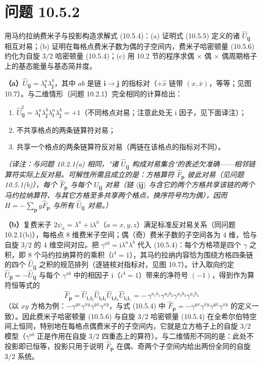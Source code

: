 \section*{问题 10.5.2}
\begin{problem}
用马约拉纳费米子与投影构造求解式 (10.5.4)：(a) 证明式 (10.5.5) 定义的诸 $\hat U_{\pmb{i}\pmb j}$ 相互对易；(b) 证明在每格点费米子数为偶的子空间内，费米子哈密顿量 (10.5.6) 约化为自旋 $3/2$ 哈密顿量 (10.5.4)；(c) 用 10.2 节的程序求偶 $\times$ 偶 $\times$ 偶周期格子上的基态能量与基态简并度。
\end{problem}
\solution
\textbf{（a）}$\hat U_{\pmb{i}\pmb j}=\lambda_{\pmb i}^{a}\lambda_{\pmb j}^{b}$，其中 $ab$ 是链 $\pmb i\to\pmb j$ 的指标对（$+\hat x$ 链带 $(x,\bar x)$，等等；见图 10.7）。与二维情形（问题 10.2.1）完全相同的计算给出：
\begin{enumerate}
\item[(i)] $\hat U_{\pmb{i}\pmb j}^{2}=\lambda_{\pmb i}^{a}\lambda_{\pmb j}^{b}\lambda_{\pmb i}^{a}\lambda_{\pmb j}^{b}=+1$（不同格点对易；注意此处无 $\mathrm i$ 因子，见下面译注）；
\item[(ii)] 不共享格点的两条链算符对易；
\item[(iii)] 共享一个格点的两条链算符反对易（两链在该格点的指标对不同）。
\end{enumerate}
\emph{（译注：与问题 10.2.1(a) 相同，"诸 $\hat U_{\pmb{i}\pmb j}$ 构成对易集合"的表述欠准确——相邻链算符实际上反对易。可解性所需且成立的是：方格算符 $\hat F_{\pmb p}$ 彼此对易（见问题 10.5.1(b)），每个 $\hat F_{\pmb p}$ 与每个 $\hat U_{\pmb{i}\pmb j}$ 对易（链 $\langle\pmb i\pmb j\rangle$ 与含它的两个方格共享该链的两个马约拉纳算符、与其它方格至多共享两个格点，换序符号均为偶），因而 $H=-\sum_{\pmb p}g\hat F_{\pmb p}$ 与所有 $\hat U_{\pmb{i}\pmb j}$ 对易。）}

\textbf{（b）}复费米子 $2\psi_{a}=\lambda^{a}+\mathrm{i}\lambda^{\bar a}$（$a=x,y,z$）满足标准反对易关系（同问题 10.2.1(b)），每格点 $8$ 维费米子空间；偶（奇）费米子数的子空间各为 $4$ 维，恰与自旋 $3/2$ 的 $4$ 维空间对应。把 $\gamma^{ab}=\mathrm{i}\lambda^{a}\lambda^{b}$ 代入 (10.5.4)：每个方格项是四个 $\gamma$ 之积，即 $8$ 个马约拉纳算符的乘积（$\mathrm i^{4}=1$），其马约拉纳内容恰为围绕方格四条链的四个 $\hat U_{\pmb i\pmb j}$ 之积的规范排列（逐链核对指标对，见图 10.7）。计入取向约定 $\hat U_{\pmb j\pmb i}=-\hat U_{\pmb i\pmb j}$ 与每个 $\gamma^{ab}$ 中的相因子 $\mathrm i$（$i^{4}=1$）带来的净符号 $(-1)$，得到作为算符恒等式的
\begin{equation*}
\hat F_{\pmb p}=\hat U_{\pmb i_1\pmb i_2}\hat U_{\pmb i_2\pmb i_3}\hat U_{\pmb i_3\pmb i_4}\hat U_{\pmb i_4\pmb i_1}
=-\,\gamma^{a_1b_1}\gamma^{a_2b_2}\gamma^{a_3b_3}\gamma^{a_4b_4}
\end{equation*}
（以 $xy$ 方格为例：$-\gamma^{yx}\gamma^{\bar x y}\gamma^{\bar y\bar x}\gamma^{x\bar y}$，与式 (10.5.4) 中 $\hat F_{\pmb p}=-\gamma^{yx}\gamma^{\bar x y}\gamma^{\bar y\bar x}\gamma^{x\bar y}$ 的定义一致）。因此费米子哈密顿量 (10.5.6) 与自旋 $3/2$ 哈密顿量 (10.5.4) 在全希尔伯特空间上恒同，特别地在每格点偶费米子的子空间内，它就是立方格子上的自旋 $3/2$ 模型（$\gamma^{ab}$ 正是作用在自旋 $3/2$ 四重态上的算符）。与二维情形不同的是：此处不投影即已恒等，投影只用于说明 $\hat F_{\pmb p}$ 在偶、奇两个子空间内给出两份全同的自旋 $3/2$ 系统。

